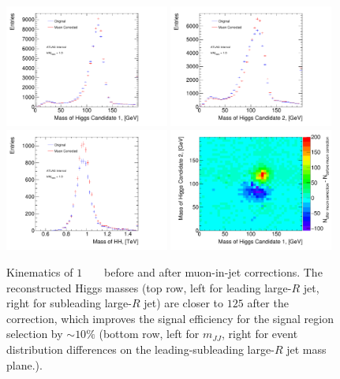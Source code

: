 \begin{figure}
\begin{center}
  \includegraphics[width=0.48\textwidth]{figures/boosted/muons/h1_mass_dbl.pdf}
  \includegraphics[width=0.48\textwidth]{figures/boosted/muons/h2_mass_dbl.pdf}
  \includegraphics[width=0.48\textwidth]{figures/boosted/muons/hh_mass_dbl.pdf}
  \includegraphics[width=0.48\textwidth]{figures/boosted/muons/h12_corr_mass.pdf}
  \caption{Kinematics of $1$ \TeV~ \Grav~ before and after muon-in-jet corrections. The reconstructed Higgs masses (top row, left for leading large-$R$ jet, right for subleading large-$R$ jet) are closer to $125$ \GeV after the correction, which improves the signal efficiency for the signal region selection by $\sim\!10\%$ (bottom row, left for $m_{JJ}$, right for event distribution differences on the leading-subleading large-$R$ jet mass plane.).}
  \label{fig:boosted-muons-signal}
\end{center}
\end{figure}

